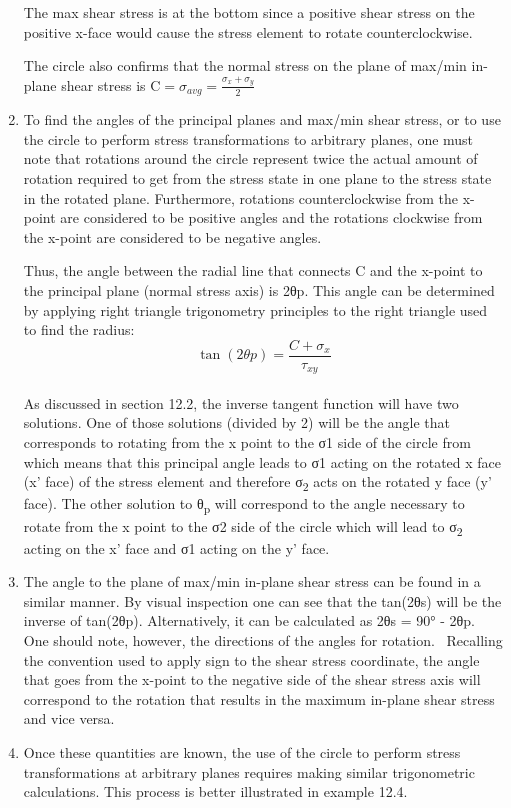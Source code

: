 \documentclass[
  letterpaper,
  DIV=11,
  numbers=noendperiod]{scrreprt}
\theoremstyle{definition}
\theoremstyle{remark}
\begin{document}
\begin{enumerate}
  The max shear stress is at the bottom since a positive shear stress on
  the positive x-face would cause the stress element to rotate
  counterclockwise.

  The circle also confirms that the normal stress on the plane of
  max/min in-plane shear stress is
  \(\mathrm{C}=\sigma_{avg}=\frac{\sigma_x+\sigma_y}{2}\)
\item
  To find the angles of the principal planes and max/min shear stress,
  or to use the circle to perform stress transformations to arbitrary
  planes, one must note that rotations around the circle represent twice
  the actual amount of rotation required to get from the stress state in
  one plane to the stress state in the rotated plane. Furthermore,
  rotations counterclockwise from the x-point are considered to be
  positive angles and the rotations clockwise from the x-point are
  considered to be negative angles.

  Thus, the angle between the radial line that connects C and the
  x-point to the principal plane (normal stress axis) is 2θp. This angle
  can be determined by applying right triangle trigonometry principles
  to the right triangle used to find the radius:\\
  \[
  \tan (2 \theta p)=\frac{C+\sigma_x}{\tau_{x y}}
  \]\\
  As discussed in section 12.2, the inverse tangent function will have
  two solutions. One of those solutions (divided by 2) will be the angle
  that corresponds to rotating from the x point to the σ1 side of the
  circle from which means that this principal angle leads to σ1 acting
  on the rotated x face (x' face) of the stress element and therefore
  σ\textsubscript{2} acts on the rotated y face (y' face). The other
  solution to θ\textsubscript{p} will correspond to the angle necessary
  to rotate from the x point to the σ2 side of the circle which will
  lead to σ\textsubscript{2} acting on the x' face and σ1 acting on the
  y' face.
\item
  The angle to the plane of max/min in-plane shear stress can be found
  in a similar manner. By visual inspection one can see that the
  tan(2θs) will be the inverse of tan(2θp). Alternatively, it can be
  calculated as 2θs = 90° - 2θp. One should note, however, the
  directions of the angles for rotation. ~Recalling the convention used
  to apply sign to the shear stress coordinate, the angle that goes from
  the x-point to the negative side of the shear stress axis will
  correspond to the rotation that results in the maximum in-plane shear
  stress and vice versa.
\item
  Once these quantities are known, the use of the circle to perform
  stress transformations at arbitrary planes requires making similar
  trigonometric calculations. This process is better illustrated in
  example 12.4.
\end{enumerate}
\end{document}
